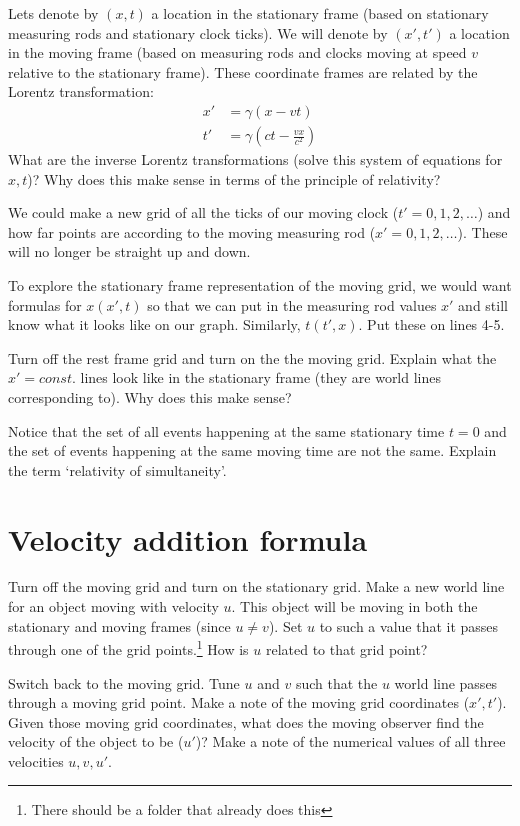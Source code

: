 \documentclass[phy1200]{handout}
\begin{document}
Lets denote by $(x,t)$ a location in the stationary frame (based on stationary measuring rods and stationary clock ticks). We will denote by $(x',t')$  a location in the moving frame (based on measuring rods and clocks moving at speed $v$ relative to the stationary frame). These coordinate frames are related by the Lorentz transformation:
\begin{align*}
    x'&=\gamma (x-vt)\\
t'&=\gamma \left(ct- \frac{vx}{c^2}\right)
\end{align*}
What are the inverse Lorentz transformations (solve this system of equations for $x,t$)? Why does this make sense in terms of the principle of relativity?

We could make a new grid of all the ticks of our moving clock ($t'=0,1,2,\dots$) and how far points are according to the moving measuring rod ($x'=0,1,2,\dots$). These will no longer be straight up and down. 

To explore the stationary frame representation of the moving grid, we would want formulas for $x(x',t)$ so that we can put in the measuring rod values $x'$ and still know what it looks like on our graph. Similarly, $t(t',x)$. Put these on lines 4-5.

Turn off the rest frame grid and turn on the the moving grid. Explain what the $x'=const.$ lines look like in the stationary frame (they are world lines corresponding to). Why does this make sense?

Notice that the set of all events happening at the same stationary time $t=0$ and the set of events happening at the same moving time are not the same. Explain the term `relativity of simultaneity'.

\section{Velocity addition formula}
Turn off the moving grid and turn on the stationary grid. Make a new world line for an object moving with velocity $u$. This object will be moving in both the stationary and moving frames (since $u\neq v$). Set $u$ to such a value that it passes through one of the grid points.\footnote{There should be a folder that already does this} How is $u$ related to that grid point?

Switch back to the moving grid. Tune $u$ and $v$ such that the $u$ world line passes through a moving grid point. Make a note of the moving grid coordinates ($x',t'$). Given those moving grid coordinates, what does the moving observer find the velocity of the object to be ($u'$)? Make a note of the numerical values of all three velocities $u,v,u'$.
\end{document}
